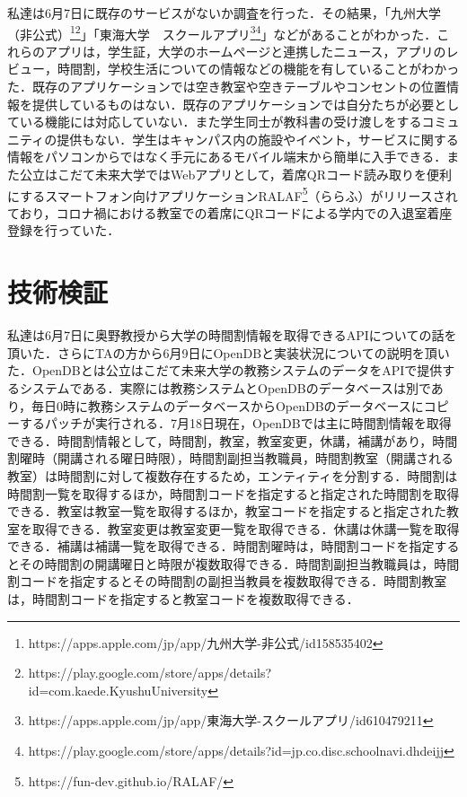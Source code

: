 私達は6月7日に既存のサービスがないか調査を行った．その結果，「九州大学（非公式）\footnote{https://apps.apple.com/jp/app/九州大学-非公式/id158535402}\footnote{https://play.google.com/store/apps/details?id=com.kaede.KyushuUniversity}」「東海大学　スクールアプリ\footnote{https://apps.apple.com/jp/app/東海大学-スクールアプリ/id610479211}\footnote{https://play.google.com/store/apps/details?id=jp.co.disc.schoolnavi.dhdeijj}」などがあることがわかった．これらのアプリは，学生証，大学のホームページと連携したニュース，アプリのレビュー，時間割，学校生活についての情報などの機能を有していることがわかった．既存のアプリケーションでは空き教室や空きテーブルやコンセントの位置情報を提供しているものはない．既存のアプリケーションでは自分たちが必要としている機能には対応していない．また学生同士が教科書の受け渡しをするコミュニティの提供もない．学生はキャンパス内の施設やイベント，サービスに関する情報をパソコンからではなく手元にあるモバイル端末から簡単に入手できる．また公立はこだて未来大学ではWebアプリとして，着席QRコード読み取りを便利にするスマートフォン向けアプリケーションRALAF\footnote{https://fun-dev.github.io/RALAF/}（ららふ）がリリースされており，コロナ禍における教室での着席にQRコードによる学内での入退室着座登録を行っていた．


\section{技術検証}

私達は6月7日に奥野教授から大学の時間割情報を取得できるAPIについての話を頂いた．さらにTAの方から6月9日にOpenDBと実装状況についての説明を頂いた．OpenDBとは公立はこだて未来大学の教務システムのデータをAPIで提供するシステムである．実際には教務システムとOpenDBのデータベースは別であり，毎日0時に教務システムのデータベースからOpenDBのデータベースにコピーするパッチが実行される．7月18日現在，OpenDBでは主に時間割情報を取得できる．時間割情報として，時間割，教室，教室変更，休講，補講があり，時間割曜時（開講される曜日時限），時間割副担当教職員，時間割教室（開講される教室）は時間割に対して複数存在するため，エンティティを分割する．時間割は時間割一覧を取得するほか，時間割コードを指定すると指定された時間割を取得できる．教室は教室一覧を取得するほか，教室コードを指定すると指定された教室を取得できる．教室変更は教室変更一覧を取得できる．休講は休講一覧を取得できる．補講は補講一覧を取得できる．時間割曜時は，時間割コードを指定するとその時間割の開講曜日と時限が複数取得できる．時間割副担当教職員は，時間割コードを指定するとその時間割の副担当教員を複数取得できる．時間割教室は，時間割コードを指定すると教室コードを複数取得できる．


